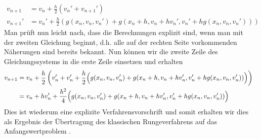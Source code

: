 \begin{exercisePage}
\begin{equation*}
\begin{aligned}
		v_{n+1} &= v_n + \frac{h}{2} \left( v_n' + v_{n+1}' \right) \\
		v_{n+1}' &= v_n' + \frac{h}{2} \left( g(x_n, v_n, v_n') + g(x_n + h, v_n + hv_n', v_n' + h g(x_n, v_n, v_n') ) \right)
		\end{aligned}
	\end{equation*}
	Man prüft nun leicht nach, dass die Berechnungen explizit sind, wenn man mit der zweiten Gleichung beginnt, d.h. alle auf der rechten Seite vorkommenden Näherungen sind bereits bekannt. Nun können wir die zweite Zeile des Gleichungssystems in die erste Zeile einsetzen und erhalten
	\begin{equation*}
		\begin{aligned}
		v_{n+1} &= v_n + \frac{h}{2} \left( v_n' + v_n' + \frac{h}{2} \Bigl( g(x_n, v_n, v_n') + g(x_n + h, v_n + hv_n', v_n' + h g(x_n, v_n, v_n') ) \Bigr) \right) \\
		&= v_n + h v_n' + \frac{h^2}{4} \Bigl( g(x_n, v_n, v_n') + g(x_n + h, v_n + hv_n', v_n' + h g(x_n, v_n, v_n') ) \Bigr)
		\end{aligned}
	\end{equation*}
	Dies ist wiederum eine explizite Verfahrensvorschrift und somit erhalten wir dies als Ergebnis der Übertragung des klassischen Rungeverfahrens auf das Anfangswertproblem .
\end{exercisePage}